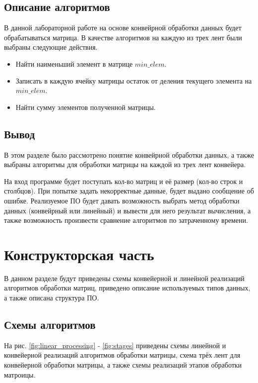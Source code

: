 \documentclass[a4paper,14pt, unknownkeysallowed]{extreport}
\begin{document}
\section{Описание алгоритмов}

В данной лабораторной работе на основе конвейрной обработки данных будет обрабатываться матрица. В качестве алгоритмов на каждую из трех лент были выбраны следующие действия.

\begin{itemize}
    \item Найти наименьший элемент в матрице $min\_elem$.
    \item Записать в каждую ячейку матрицы остаток от деления текущего элемента на $min\_elem$.
    \item Найти сумму элементов полученной матрицы.
\end{itemize}

\section{Вывод}

В этом разделе было рассмотрено понятие конвейрной обработки данных, а также выбраны алгоритмы для обработки матрицы на каждой из трех лент конвейера.

 На вход программе будет поступать кол-во матриц и её размер (кол-во строк и столбцов). При попытке задать некорректные данные, будет выдано сообщение об ошибке. Реализуемое ПО будет давать возможность выбрать метод обработки данных (конвейрный или линейный) и вывести для него результат вычисления, а также возможность произвести сравнение алгоритмов по затраченному времени.



\chapter{Конструкторская часть}

В данном разделе будут приведены схемы конвейерной и линейной реализаций алгоритмов обработки матриц, приведено описание используемых типов данных, а также описана структура ПО.

\section{Схемы алгоритмов}

На рис. \ref{fig:linear_processing} - \ref{fig:stages} приведены схемы линейной и конвейерной реализаций алгоритмов обработки матрицы, схема трёх лент для конвейерной обработки матрицы, а также схемы реализаций этапов обработки матроицы.
\end{document}
